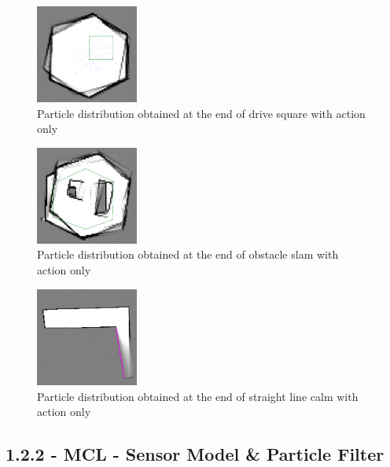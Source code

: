 \documentclass[journal,onecolumn]{IEEEtran}
\begin{document}
\begin{figure}[H]
\centering
\includegraphics[width=0.3\textwidth]{Media/1211.png}
\caption{Particle distribution obtained at the end of drive square with action only}
\end{figure}

\begin{figure}[H]
\centering
\includegraphics[width=0.3\textwidth]{Media/1212.png}
\caption{Particle distribution obtained at the end of obstacle slam with action only}
\end{figure}

\begin{figure}[H]
\centering
\includegraphics[width=0.3\textwidth]{Media/1213.png}
\caption{Particle distribution obtained at the end of straight line calm with action only}
\end{figure}

\subsection*{1.2.2 - MCL - Sensor Model \& Particle Filter} 
\end{document}

